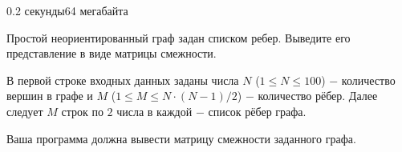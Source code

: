 \begin{problem}{}{}{}{0.2 секунды}{64 мегабайта}

Простой неориентированный граф задан списком ребер. Выведите его представление в виде матрицы смежности.

\InputFile
В первой строке входных данных заданы числа $N$ ($1 \le N \le 100$) $-$ количество вершин в графе и 
$M$ ($1 \le M \le N\cdot(N-1)/2$) $-$ количество рёбер.
Далее следует $M$ строк по $2$ числа в каждой $-$ список рёбер графа. 

\OutputFile
Ваша программа должна вывести матрицу смежности заданного графа.

\Example

\begin{example}
%
\end{example}

\end{problem}

